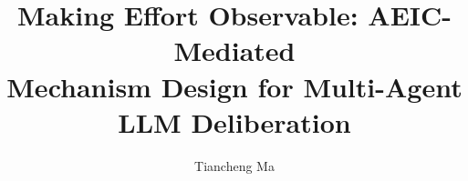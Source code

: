 \documentclass[runningheads]{llncs}
\begin{document}
\title{Making Effort Observable: AEIC-Mediated\\Mechanism Design for Multi-Agent LLM Deliberation}


\author{Tiancheng Ma}


\maketitle














\end{document}

